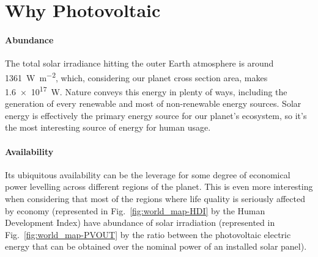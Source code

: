 \section{Why Photovoltaic}

 \paragraph{Abundance} The total solar irradiance hitting the outer Earth atmosphere is around \SI{1361}{\watt\per\square\metre},\cite{Kopp2011} which, considering our planet cross section area, makes \SI{1.6e17}{\watt}.
 Nature conveys this energy in plenty of ways, including the generation of every renewable and most of non-renewable energy sources.
 Solar energy is effectively the primary energy source for our planet's ecosystem, so it's the most interesting source of energy for human usage.

 \paragraph{Availability} Its ubiquitous availability can be the leverage for some degree of economical power levelling across different regions of the planet.
 This is even more interesting when considering that most of the regions where life quality is seriously affected by economy (represented in Fig.~\ref{fig:world_map-HDI} by the Human Development Index) have abundance of solar irradiation (represented in Fig.~\ref{fig:world_map-PVOUT} by the ratio between the photovoltaic electric energy that can be obtained over the nominal power of an installed solar panel).

